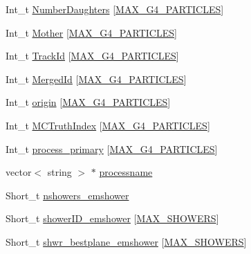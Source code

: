 \begin{DoxyCompactItemize}
\item 
Int\-\_\-t \hyperlink{classanatree_a4050a454626a657acbc04c35963260f1}{Number\-Daughters} \mbox{[}\hyperlink{anatree__core__v09410002__orig_8h_aa5cbba5cc53c011e88805f38503de894}{M\-A\-X\-\_\-\-G4\-\_\-\-P\-A\-R\-T\-I\-C\-L\-E\-S}\mbox{]}
\item 
Int\-\_\-t \hyperlink{classanatree_a54b7b08ef69d97e58476661f41e1c157}{Mother} \mbox{[}\hyperlink{anatree__core__v09410002__orig_8h_aa5cbba5cc53c011e88805f38503de894}{M\-A\-X\-\_\-\-G4\-\_\-\-P\-A\-R\-T\-I\-C\-L\-E\-S}\mbox{]}
\item 
Int\-\_\-t \hyperlink{classanatree_a01c9a26606481a2f8463e30b238c0181}{Track\-Id} \mbox{[}\hyperlink{anatree__core__v09410002__orig_8h_aa5cbba5cc53c011e88805f38503de894}{M\-A\-X\-\_\-\-G4\-\_\-\-P\-A\-R\-T\-I\-C\-L\-E\-S}\mbox{]}
\item 
Int\-\_\-t \hyperlink{classanatree_a35ce564593e3fd4b91ce55d0277cc141}{Merged\-Id} \mbox{[}\hyperlink{anatree__core__v09410002__orig_8h_aa5cbba5cc53c011e88805f38503de894}{M\-A\-X\-\_\-\-G4\-\_\-\-P\-A\-R\-T\-I\-C\-L\-E\-S}\mbox{]}
\item 
Int\-\_\-t \hyperlink{classanatree_a459ef75bdfe9607b73e38318c36fdf50}{origin} \mbox{[}\hyperlink{anatree__core__v09410002__orig_8h_aa5cbba5cc53c011e88805f38503de894}{M\-A\-X\-\_\-\-G4\-\_\-\-P\-A\-R\-T\-I\-C\-L\-E\-S}\mbox{]}
\item 
Int\-\_\-t \hyperlink{classanatree_a894f10e8e21f088ef42d5f2688eb2430}{M\-C\-Truth\-Index} \mbox{[}\hyperlink{anatree__core__v09410002__orig_8h_aa5cbba5cc53c011e88805f38503de894}{M\-A\-X\-\_\-\-G4\-\_\-\-P\-A\-R\-T\-I\-C\-L\-E\-S}\mbox{]}
\item 
Int\-\_\-t \hyperlink{classanatree_a104d39060f7947f9e5c2ee46e33ef686}{process\-\_\-primary} \mbox{[}\hyperlink{anatree__core__v09410002__orig_8h_aa5cbba5cc53c011e88805f38503de894}{M\-A\-X\-\_\-\-G4\-\_\-\-P\-A\-R\-T\-I\-C\-L\-E\-S}\mbox{]}
\item 
vector$<$ string $>$ $\ast$ \hyperlink{classanatree_a5f73011fc98884bb1cfe96f9dcc863e7}{processname}
\item 
Short\-\_\-t \hyperlink{classanatree_a80eafdfb7712108c482a65427d4dab62}{nshowers\-\_\-emshower}
\item 
Short\-\_\-t \hyperlink{classanatree_a35b20eca4b3c6b9309254a99199aa916}{shower\-I\-D\-\_\-emshower} \mbox{[}\hyperlink{anatree__core__v09410002__orig_8h_aa8deaf72f1f7bd4b88c7d1ea07590801}{M\-A\-X\-\_\-\-S\-H\-O\-W\-E\-R\-S}\mbox{]}
\item 
Short\-\_\-t \hyperlink{classanatree_a3ba83de19a2215bceb3527513df9e878}{shwr\-\_\-bestplane\-\_\-emshower} \mbox{[}\hyperlink{anatree__core__v09410002__orig_8h_aa8deaf72f1f7bd4b88c7d1ea07590801}{M\-A\-X\-\_\-\-S\-H\-O\-W\-E\-R\-S}\mbox{]}

\end{DoxyCompactItemize}
